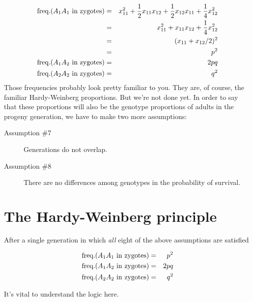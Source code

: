 \documentclass[12pt]{article}
\begin{document}
\begin{eqnarray*}
\hbox{freq.}(A_1A_1\hbox{ in zygotes}) &=&
   x_{11}^2 + \frac{1}{2}x_{11}x_{12} + \frac{1}{2}x_{12}x_{11}
   + \frac{1}{4}x_{12}^2 \\
&=& x_{11}^2 + x_{11}x_{12} + \frac{1}{4}x_{12}^2 \\
&=& (x_{11} + x_{12}/2)^2 \\
&=& p^2 \\
\hbox{freq.}(A_1A_2\hbox{ in zygotes}) &=& 2pq \\
\hbox{freq.}(A_2A_2\hbox{ in zygotes}) &=& q^2 \\
\end{eqnarray*}
Those frequencies probably look pretty familiar to you. They are, of
course, the familiar Hardy-Weinberg proportions. But we're not done
yet. In order to say that these proportions will also be the genotype
proportions of adults in the progeny generation, we have to make two
more assumptions:

\begin{description}

\item[Assumption \#7] Generations do not overlap.

\item[Assumption \#8] There are no differences among genotypes in the
probability of survival.

\end{description}

\section*{The Hardy-Weinberg principle}

After a single generation in which {\it all\/} eight of the above
assumptions are satisfied

\begin{eqnarray}
\hbox{freq.}(A_1A_1\hbox{ in zygotes}) &=& p^2 \label{eq:hw-p2} \\
\hbox{freq.}(A_1A_2\hbox{ in zygotes}) &=& 2pq \label{eq:hw-2pq} \\
\hbox{freq.}(A_2A_2\hbox{ in zygotes}) &=& q^2 \label{eq:hw-q2} 
\end{eqnarray}

\noindent It's vital to understand the logic here.
\end{document}
